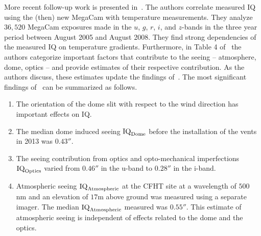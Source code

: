 More recent follow-up work is presented in~\cite{salmon2009cfht}.  The authors correlate measured IQ using the (then) new MegaCam with temperature measurements. They analyze $36,520$ MegaCam exposures made in the $u$, $g$, $r$, $i$, and $z$-bands in the three year period between August 2005 and  August 2008.  They find strong dependencies of the measured IQ on temperature gradients. Furthermore, in  Table 4 of~\cite{salmon2009cfht} the authors categorize important factors that contribute to the seeing -- atmosphere, dome, optics -- and provide estimates of their respective contribution.
As the authors discuss, these estimates update the findings of~\cite{racine1991mirror}.  The most significant findings of~\cite{salmon2009cfht} can be summarized as follows.
\begin{enumerate}
\item The orientation of the dome slit with respect to the wind direction has important effects on IQ.
\item The median dome induced seeing $\textrm{IQ}_{\textrm{Dome}}$ before the installation of the vents in 2013 was $0.43''$.
\item The seeing contribution from optics and opto-mechanical imperfections $\textrm{IQ}_{\textrm{Optics}}$ varied from $0.46''$  in the u-band  to $0.28''$  in the i-band. 
\item Atmospheric seeing $\textrm{IQ}_{\textrm{Atmospheric}}$ at the CFHT site at a wavelength of $500$ nm and an elevation of $17$m above ground was measured using a separate imager.  The median $\textrm{IQ}_{\textrm{Atmospheric}}$ measured was $0.55''$.  This estimate of atmospheric seeing is independent of effects related to the dome and the optics.
\end{enumerate}



